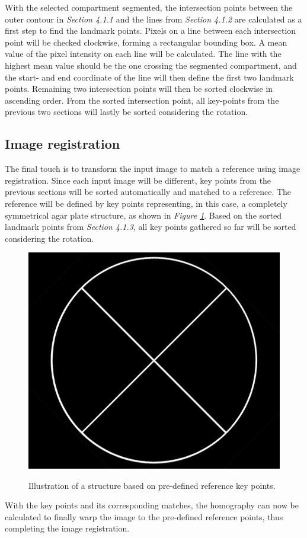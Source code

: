 \noindent With the selected compartment segmented, the intersection points between the outer contour in \textit{Section 4.1.1} and the lines from \textit{Section 4.1.2} are calculated as a first step to find the landmark points. Pixels on a line between each intersection point will be checked clockwise, forming a rectangular bounding box. A mean value of the pixel intensity on each line will be calculated. The line with the highest mean value should be the one crossing the segmented compartment, and the start- and end coordinate of the line will then define the first two landmark points. Remaining two intersection points will then be sorted clockwise in ascending order. From the sorted intersection point, all key-points from the previous two sections will lastly be sorted considering the rotation.


\subsection{Image registration}
The final touch is to transform the input image to match a reference using image registration. Since each input image will be different, key points from the previous sections will be sorted automatically and matched to a reference. The reference will be defined by key points representing, in this case, a completely symmetrical agar plate structure, as shown in \textit{Figure \ref{fig:keypoint structure}}.  Based on the sorted landmark points from \textit{Section 4.1.3}, all key points gathered so far will be sorted considering the rotation.\\

\begin{figure}[htbp]
    \centering
    \includegraphics[width=0.3\linewidth]{figures/PDF/Ref_structure_correct.png}\\
    \caption{Illustration of a structure based on pre-defined reference key points.}
    \label{fig:keypoint structure}
\end{figure}

\noindent With the key points and its corresponding matches, the homography can now be calculated to finally warp the image to the pre-defined reference points, thus completing the image registration.\\

